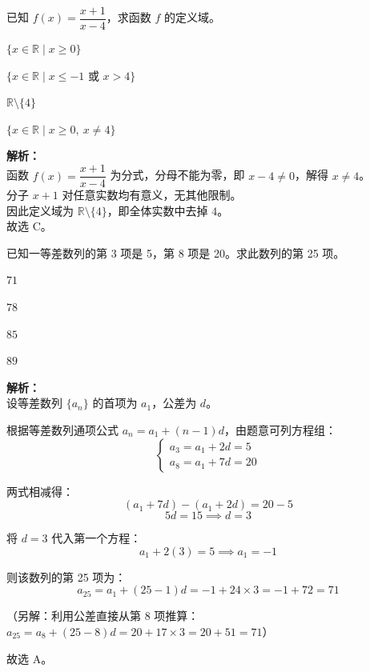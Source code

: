 \documentclass[12pt,a4paper]{exam-zh}
\begin{document}





\begin{question}
    已知 $f(x)=\dfrac{x+1}{x-4}$，求函数 $f$ 的定义域。\paren[C]
    \begin{choices}
        \item $\{x\in\mathbb{R}\mid x\ge 0\}$
        \item $\{x\in\mathbb{R}\mid x\le -1\text{ 或 }x>4\}$
        \item $\mathbb{R}\setminus\{4\}$
        \item $\{x\in\mathbb{R}\mid x\ge 0,\ x\ne 4\}$
    \end{choices}
\end{question}

\begin{solution}
    \textbf{解析：} \\
    函数 $f(x)=\dfrac{x+1}{x-4}$ 为分式，分母不能为零，即 $x-4\ne 0$，解得 $x\ne 4$。 \\
    分子 $x+1$ 对任意实数均有意义，无其他限制。 \\
    因此定义域为 $\mathbb{R}\setminus\{4\}$，即全体实数中去掉 $4$。 \\
    故选 C。
\end{solution}

\begin{question}
    已知一等差数列的第 3 项是 5，第 8 项是 20。求此数列的第 25 项。
    \begin{choices}
        \item $71$
        \item $78$
        \item $85$
        \item $89$
    \end{choices}
\end{question}
\begin{solution}
    \textbf{解析：} \\
    设等差数列 $\{a_n\}$ 的首项为 $a_1$，公差为 $d$。
    
    根据等差数列通项公式 $a_n = a_1 + (n-1)d$，由题意可列方程组：
    \[ \begin{cases} a_3 = a_1 + 2d = 5 \\ a_8 = a_1 + 7d = 20 \end{cases} \]
    
    两式相减得：
    \[ (a_1 + 7d) - (a_1 + 2d) = 20 - 5 \]
    \[ 5d = 15 \implies d = 3 \]
    
    将 $d = 3$ 代入第一个方程：
    \[ a_1 + 2(3) = 5 \implies a_1 = -1 \]
    
    则该数列的第 25 项为：
    \[ a_{25} = a_1 + (25-1)d = -1 + 24 \times 3 = -1 + 72 = 71 \]
    
    （另解：利用公差直接从第 8 项推算：$a_{25} = a_8 + (25-8)d = 20 + 17 \times 3 = 20 + 51 = 71$）
    
    故选 A。
\end{solution}
\end{document}
